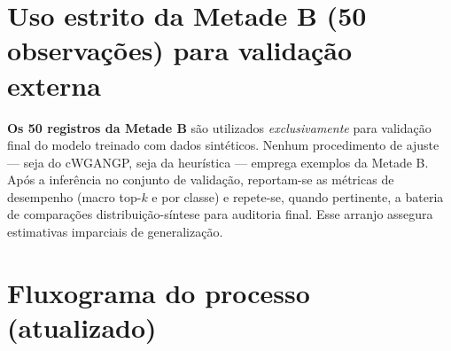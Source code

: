 \documentclass[12pt,a4paper]{report}
\begin{document}
\section{Uso estrito da Metade B (50 observações) para validação externa}
\textbf{Os 50 registros da Metade B} são utilizados \emph{exclusivamente} para validação final do modelo treinado com dados sintéticos. Nenhum procedimento de ajuste --- seja do cWGAN\textendash GP, seja da heurística --- emprega exemplos da Metade B. Após a inferência no conjunto de validação, reportam-se as métricas de desempenho (macro top-$k$ e por classe) e repete-se, quando pertinente, a bateria de comparações distribuição-síntese para auditoria final. Esse arranjo assegura estimativas imparciais de generalização.

\section*{Fluxograma do processo (atualizado)}
\end{document}
